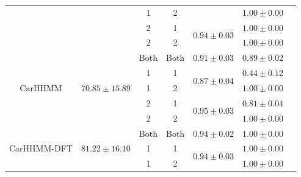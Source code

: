 \documentclass[12pt]{TD-CJS}
\begin{document}
{\begin{tabular}{ccccccc}
                           &                                    & 1                             & 2                                &                                   & $1.00 \pm 0.00$                       \\ 
                           &                                    & 2                             & 1                                & \multirow{2}{*}{$0.94\pm0.03$}    & $1.00 \pm 0.00$                       \\ 
                           &                                    & 2                             & 2                                &                                   & $1.00 \pm 0.00$                       \\ \hline
\multirow{5}{*}{CarHHMM}   & \multirow{5}{*}{$70.85 \pm 15.89$}   & Both                          & Both                             & $0.91 \pm 0.03$                   & $0.89 \pm 0.02$                       \\
                           &                                    & 1                             & 1                                & \multirow{2}{*}{$0.87\pm0.04$}    & $0.44 \pm 0.12$                       \\ 
                           &                                    & 1                             & 2                                &                                   & $1.00 \pm 0.00$                       \\ 
                           &                                    & 2                             & 1                                & \multirow{2}{*}{$0.95\pm0.03$}    & $0.81 \pm 0.04$                       \\ 
                           &                                    & 2                             & 2                                &                                   & $1.00 \pm 0.00$                       \\ \hline
\multirow{5}{*}{CarHHMM-DFT}& \multirow{5}{*}{$81.22 \pm 16.10$}   & Both                          & Both                             & $0.94 \pm 0.02$                   & $1.00 \pm 0.00$                       \\
                           &                                    & 1                             & 1                                & \multirow{2}{*}{$0.94\pm0.03$}    & $1.00 \pm 0.00$                       \\ 
                           &                                    & 1                             & 2                                &                                   & $1.00 \pm 0.00$                       \\ 

\end{tabular}}
\end{document}
